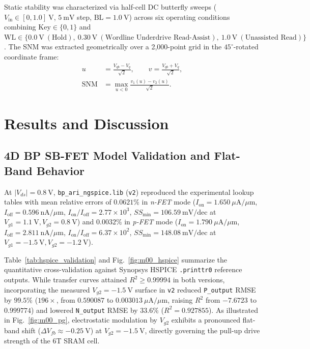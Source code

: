 \documentclass[conference]{IEEEtran}
\begin{document}
Static stability was characterized via half-cell DC butterfly sweeps ($V_{\mathrm{in}} \in [0, 1.0]\ \text{V}$, $5\ \text{mV}$ step, $\mathrm{BL} = 1.0\ \text{V}$) across six operating conditions combining $\text{Key} \in \{0, 1\}$ and $\mathrm{WL} \in \{0.0\ \text{V}\ (\text{Hold}),\ 0.30\ \text{V}\ (\text{Wordline Underdrive Read-Assist}),\ 1.0\ \text{V}\ (\text{Unassisted Read})\}$. The SNM was extracted geometrically over a 2,000-point grid in the $45^\circ$-rotated coordinate frame:
\begin{align}
u &= \frac{V_{qb} - V_q}{\sqrt{2}}, \qquad v = \frac{V_{qb} + V_q}{\sqrt{2}}, \nonumber \\
\mathrm{SNM} &= \max_{u < 0} \frac{v_1(u) - v_2(u)}{\sqrt{2}}. \label{eq:snm_45}
\end{align}

\section{Results and Discussion}
\subsection{4D BP SB-FET Model Validation and Flat-Band Behavior}
At $|V_{ds}| = 0.8\ \text{V}$, \texttt{bp\_ari\_\allowbreak ngspice.lib} (\texttt{v2}) reproduced the experimental lookup tables with mean relative errors of $0.0621\%$ in \textit{n-FET} mode ($I_{\mathrm{on}} = 1.650\ \mu\text{A}/\mu\text{m}$, $I_{\mathrm{off}} = 0.596\ \text{nA}/\mu\text{m}$, $I_{\mathrm{on}}/I_{\mathrm{off}} = 2.77 \times 10^3$, $SS_{\min} = 106.59\ \text{mV/dec}$ at $V_{g1}=1.1\ \text{V}, V_{g2}=0.8\ \text{V}$) and $0.0032\%$ in \textit{p-FET} mode ($I_{\mathrm{on}} = 1.790\ \mu\text{A}/\mu\text{m}$, $I_{\mathrm{off}} = 2.811\ \text{nA}/\mu\text{m}$, $I_{\mathrm{on}}/I_{\mathrm{off}} = 6.37 \times 10^2$, $SS_{\min} = 148.08\ \text{mV/dec}$ at $V_{g1}=-1.5\ \text{V}, V_{g2}=-1.2\ \text{V}$).

Table~\ref{tab:hspice_validation} and Fig.~\ref{fig:m00_hspice} summarize the quantitative cross-validation against Synopsys HSPICE \texttt{.printtr0} reference outputs. While transfer curves attained $R^2 \ge 0.99994$ in both versions, incorporating the measured $V_{g2} = -1.5\ \text{V}$ surface in \texttt{v2} reduced \texttt{P\_output} RMSE by $99.5\%$ (\textbf{$196\times$}, from $0.590087$ to $0.003013\ \mu\text{A}/\mu\text{m}$, raising $R^2$ from $-7.6723$ to $0.999774$) and lowered \texttt{N\_output} RMSE by $33.6\%$ ($R^2 = 0.927855$). As illustrated in Fig.~\ref{fig:m00_pg}, electrostatic modulation by $V_{g2}$ exhibits a pronounced flat-band shift ($\Delta V_{fb} \approx -0.25\ \text{V}$) at $V_{g2} = -1.5\ \text{V}$, directly governing the pull-up drive strength of the 6T SRAM cell.
\end{document}
